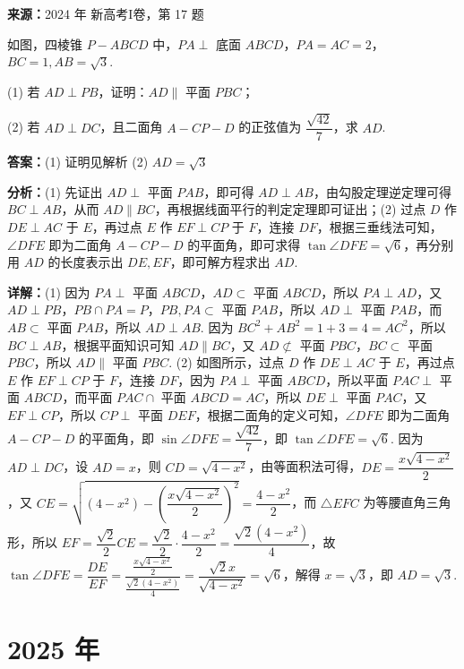 \begin{question}[points=15]
\textbf{来源：}2024 年 新高考I卷，第 17 题\par
如图，四棱锥 $P-ABCD$ 中，$PA\perp$ 底面 $ABCD$，$PA=AC=2$，$BC=1, AB=\sqrt{3}$.

(1) 若 $AD\perp PB$，证明：$AD\parallel$ 平面 $PBC$；

(2) 若 $AD\perp DC$，且二面角 $A-CP-D$ 的正弦值为 $\dfrac{\sqrt{42}}{7}$，求 $AD$.
\begin{solution}
\textbf{答案：}(1) 证明见解析 (2) $AD=\sqrt{3}$

\textbf{分析：}(1) 先证出 $AD\perp$ 平面 $PAB$，即可得 $AD\perp AB$，由勾股定理逆定理可得 $BC\perp AB$，从而 $AD\parallel BC$，再根据线面平行的判定定理即可证出；(2) 过点 $D$ 作 $DE\perp AC$ 于 $E$，再过点 $E$ 作 $EF\perp CP$ 于 $F$，连接 $DF$，根据三垂线法可知，$\angle DFE$ 即为二面角 $A-CP-D$ 的平面角，即可求得 $\tan\angle DFE=\sqrt{6}$，再分别用 $AD$ 的长度表示出 $DE,EF$，即可解方程求出 $AD$.

\textbf{详解：}(1) 因为 $PA\perp$ 平面 $ABCD$，$AD\subset$ 平面 $ABCD$，所以 $PA\perp AD$，又 $AD\perp PB$，$PB\cap PA=P$，$PB,PA\subset$ 平面 $PAB$，所以 $AD\perp$ 平面 $PAB$，而 $AB\subset$ 平面 $PAB$，所以 $AD\perp AB$. 因为 $BC^2+AB^2=1+3=4=AC^2$，所以 $BC\perp AB$，根据平面知识可知 $AD\parallel BC$，又 $AD\not\subset$ 平面 $PBC$，$BC\subset$ 平面 $PBC$，所以 $AD\parallel$ 平面 $PBC$.
(2) 如图所示，过点 $D$ 作 $DE\perp AC$ 于 $E$，再过点 $E$ 作 $EF\perp CP$ 于 $F$，连接 $DF$，因为 $PA\perp$ 平面 $ABCD$，所以平面 $PAC\perp$ 平面 $ABCD$，而平面 $PAC\cap$ 平面 $ABCD=AC$，所以 $DE\perp$ 平面 $PAC$，又 $EF\perp CP$，所以 $CP\perp$ 平面 $DEF$，根据二面角的定义可知，$\angle DFE$ 即为二面角 $A-CP-D$ 的平面角，即 $\sin\angle DFE=\dfrac{\sqrt{42}}{7}$，即 $\tan\angle DFE=\sqrt{6}$. 因为 $AD\perp DC$，设 $AD=x$，则 $CD=\sqrt{4-x^2}$，由等面积法可得，$DE=\dfrac{x\sqrt{4-x^2}}{2}$，又 $CE=\sqrt{(4-x^2)-\left(\dfrac{x\sqrt{4-x^2}}{2}\right)^2}=\dfrac{4-x^2}{2}$，而 $\triangle EFC$ 为等腰直角三角形，所以 $EF=\dfrac{\sqrt{2}}{2}CE=\dfrac{\sqrt{2}}{2}\cdot\dfrac{4-x^2}{2}=\dfrac{\sqrt{2}(4-x^2)}{4}$，故 $\tan\angle DFE=\dfrac{DE}{EF}=\dfrac{\frac{x\sqrt{4-x^2}}{2}}{\frac{\sqrt{2}(4-x^2)}{4}}=\dfrac{\sqrt{2}x}{\sqrt{4-x^2}}=\sqrt{6}$，解得 $x=\sqrt{3}$，即 $AD=\sqrt{3}$.
\end{solution}
\end{question}

\section*{2025 年}

